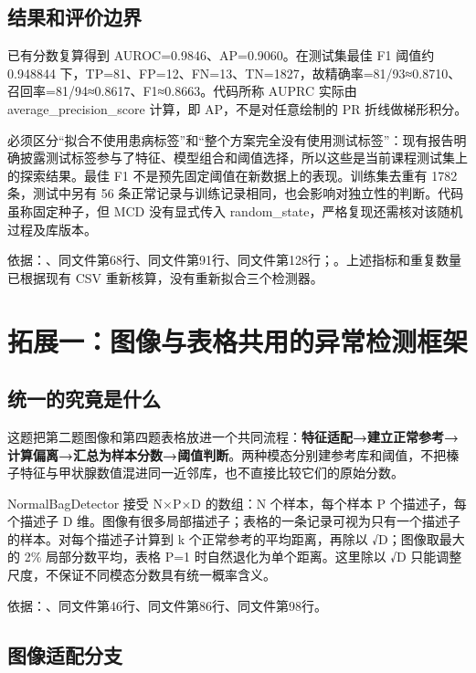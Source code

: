 \documentclass[UTF8,fontset=windows,11pt,a4paper]{ctexart}
\begin{document}
\subsection{结果和评价边界}

已有分数复算得到 AUROC=0.9846、AP=0.9060。在测试集最佳 F1 阈值约 0.948844 下，TP=81、FP=12、FN=13、TN=1827，故精确率=81/93≈0.8710、召回率=81/94≈0.8617、F1≈0.8663。代码所称 AUPRC 实际由 average\_precision\_score 计算，即 AP，不是对任意绘制的 PR 折线做梯形积分。

必须区分“拟合不使用患病标签”和“整个方案完全没有使用测试标签”：现有报告明确披露测试标签参与了特征、模型组合和阈值选择，所以这些是当前课程测试集上的探索结果。最佳 F1 不是预先固定阈值在新数据上的表现。训练集去重有 1782 条，测试中另有 56 条正常记录与训练记录相同，也会影响对独立性的判断。代码虽称固定种子，但 MCD 没有显式传入 random\_state，严格复现还需核对该随机过程及库版本。

依据：、同文件第68行、同文件第91行、同文件第128行；。上述指标和重复数量已根据现有 CSV 重新核算，没有重新拟合三个检测器。\section{拓展一：图像与表格共用的异常检测框架}

\subsection{统一的究竟是什么}

这题把第二题图像和第四题表格放进一个共同流程：\textbf{特征适配→建立正常参考→计算偏离→汇总为样本分数→阈值判断}。两种模态分别建参考库和阈值，不把榛子特征与甲状腺数值混进同一近邻库，也不直接比较它们的原始分数。

NormalBagDetector 接受 N×P×D 的数组：N 个样本，每个样本 P 个描述子，每个描述子 D 维。图像有很多局部描述子；表格的一条记录可视为只有一个描述子的样本。对每个描述子计算到 k 个正常参考的平均距离，再除以 √D；图像取最大的 2\% 局部分数平均，表格 P=1 时自然退化为单个距离。这里除以 √D 只能调整尺度，不保证不同模态分数具有统一概率含义。

依据：、同文件第46行、同文件第86行、同文件第98行。

\subsection{图像适配分支}
\end{document}
